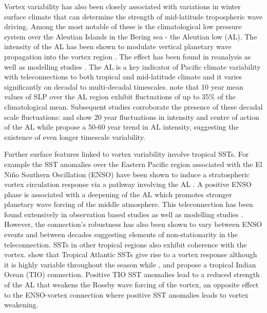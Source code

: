 \documentclass[wcd, manuscript]{copernicus}
\begin{document}
Vortex variability has also been closely associated with variations in winter surface climate that can determine the strength of mid-latitude tropospheric wave driving. Among the most notable of these is the climatological low pressure system over the Aleutian Islands in the Bering sea - the Aleutian low (AL). The intensity of the AL has been shown to modulate vertical planetary wave propagation into the vortex region \citep{Woo2015, Garfinkel2010, Manzini2006}. The effect has been found in reanalysis \citep{Hu2018}  as well as modelling studies \citep{kren2016, Kang2017,Taguchi2006}. The AL is a key indicator of Pacific climate variability with teleconnections to both tropical and mid-latitude climate \citep{Nitta1989, Trenberth1994, Zhang1997} and it varies significantly on decadal to multi-decadal timescales. \cite{Overland1999} note that 10 year mean values of SLP over the AL region exhibit fluctuations of up to 35\% of the climatological mean. Subsequent studies corroborate the presence of these decadal scale fluctuations: \cite{SUGIMOTO2009} and \cite{Minobe} show 20 year fluctuations in intensity and centre of action of the AL while \cite{Raible2005} propose a 50-60 year trend in AL intensity, suggesting the existence of even longer timescale variability. 

Further surface features linked to vortex variability involve tropical SSTs. For example the SST anomalies over the Eastern Pacific region associated with the El Ni\~{n}o Southern Oscillation (ENSO) have been shown to induce a stratospheric vortex circulation response via a pathway involving the AL \citep{Domeison2019}. A positive ENSO phase is associated with a deepening of the AL which promotes stronger planetary wave forcing of the middle atmosphere. This teleconnection has been found extensively in observation based studies \citep{Garfinkel2008, Ineson2009, Smith2012}  as well as modelling studies \citep{Bell2009, Domeison2015, Manzini2006, Richter2015}. However, the connection's robustness has also been shown to vary between ENSO events \citep{deser2017, Iza2016} and between decades \citep{ayarzaguena2018} suggesting elements of non-stationarity in the teleconnection. SSTs in other tropical regions also exhibit coherence with the vortex. \cite{Rao2017} show that Tropical Atlantic SSTs give rise to a vortex response although it is highly variable throughout the season while \cite{Fletcher}, \cite{Fletcher_model} and \cite{Rao2015} propose a tropical Indian Ocean (TIO) connection. Positive TIO SST anomalies lead to a reduced strength of the AL that weakens the Rossby wave forcing of the vortex, an opposite effect to the ENSO-vortex connection where positive SST anomalies leads to vortex weakening.
\end{document}
